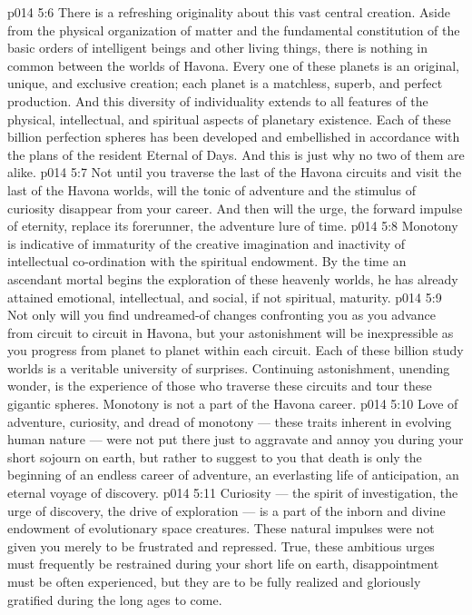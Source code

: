 \vs p014 5:6 \pc There is a refreshing originality about this vast central creation. Aside from the physical organization of matter and the fundamental constitution of the basic orders of intelligent beings and other living things, there is nothing in common between the worlds of Havona. Every one of these planets is an original, unique, and exclusive creation; each planet is a matchless, superb, and perfect production. And this diversity of individuality extends to all features of the physical, intellectual, and spiritual aspects of planetary existence. Each of these billion perfection spheres has been developed and embellished in accordance with the plans of the resident Eternal of Days. And this is just why no two of them are alike.
\vs p014 5:7 Not until you traverse the last of the Havona circuits and visit the last of the Havona worlds, will the tonic of adventure and the stimulus of curiosity disappear from your career. And then will the urge, the forward impulse of eternity, replace its forerunner, the adventure lure of time.
\vs p014 5:8 Monotony is indicative of immaturity of the creative imagination and inactivity of intellectual co\hyp{}ordination with the spiritual endowment. By the time an ascendant mortal begins the exploration of these heavenly worlds, he has already attained emotional, intellectual, and social, if not spiritual, maturity.
\vs p014 5:9 Not only will you find undreamed\hyp{}of changes confronting you as you advance from circuit to circuit in Havona, but your astonishment will be inexpressible as you progress from planet to planet within each circuit. Each of these billion study worlds is a veritable university of surprises. Continuing astonishment, unending wonder, is the experience of those who traverse these circuits and tour these gigantic spheres. Monotony is not a part of the Havona career.
\vs p014 5:10 Love of adventure, curiosity, and dread of monotony --- these traits inherent in evolving human nature --- were not put there just to aggravate and annoy you during your short sojourn on earth, but rather to suggest to you that death is only the beginning of an endless career of adventure, an everlasting life of anticipation, an eternal voyage of discovery.
\vs p014 5:11 Curiosity --- the spirit of investigation, the urge of discovery, the drive of exploration --- is a part of the inborn and divine endowment of evolutionary space creatures. These natural impulses were not given you merely to be frustrated and repressed. True, these ambitious urges must frequently be restrained during your short life on earth, disappointment must be often experienced, but they are to be fully realized and gloriously gratified during the long ages to come.
